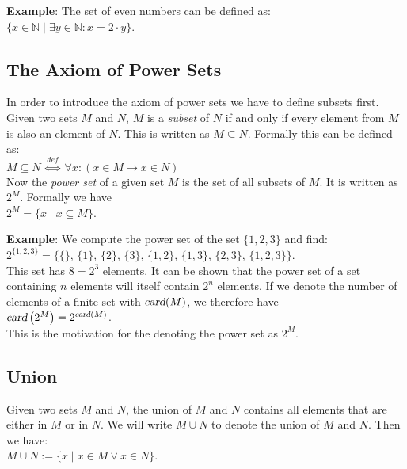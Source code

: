 \noindent
\textbf{Example}:
The set of even numbers can be defined as: \\[0.2cm]
\hspace*{1.3cm} $\{ x \in \mathbb{N} \;|\; \exists y\in \mathbb{N}: x = 2 \cdot y \}$. 

\subsection{The Axiom of Power  Sets}
In order to introduce the axiom of power sets we have to define subsets first.
Given two sets $M$ and $N$,  $M$ is a 
\emph{subset} of $N$ if and only if every element from $M$ is also an element of $N$.
This is written as $M \subseteq N$.  Formally this can be defined as: \\[0.2cm]
\hspace*{1.3cm} $M \subseteq N \;\stackrel{de\!f}{\Longleftrightarrow}\; \forall x: (x \in M \rightarrow x \in N)$ \\[0.2cm]
Now the  \emph{power set} of a given set $M$ is the set of all subsets of $M$.
It is written as $2^M$.  Formally we have \\[0.2cm]
\hspace*{1.3cm} $2^M = \{ x \;|\; x \subseteq M \}$.
\vspace{0.2cm}

\noindent
\textbf{Example}: 
We compute the power set of the set $\{1,2,3\}$ and find: \\[0.2cm]
\hspace*{1.3cm} $2^{\{1,2,3\}} = \big\{ \{\},\, \{1\}, \, \{2\},\, \{3\},\, \{1,2\}, \, \{1,3\}, \, \{2,3\},\, \{1,2,3\}\big\}$. \\[0.2cm]
This set has  $8 = 2^3$ elements.  It can be shown that the power set of a set containing
$n$ elements will itself contain $2^n$ elements.  If we denote the number of elements of a
finite set with 
$\textsl{card}(M)$, we therefore have
\\[0.2cm]
\hspace*{1.3cm}
$\textsl{card}\left(2^M\right) = 2^{\textsl{card}(M)}$.
\\[0.2cm]
This is the motivation for the denoting the power set as  $2^M$.

\subsection{Union}
Given two sets  $M$ and $N$, the union of  $M$ and $N$ contains all elements that are
either in $M$ or in $N$.  We will write  $M \cup N$ to denote the union of $M$ and $N$.
Then we have: \\[0.2cm]
\hspace*{1.3cm} $M \cup N := \{ x \;|\; x \in M \vee x \in N \}$. 
\vspace{0.2cm}

